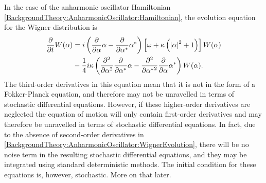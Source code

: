 In the case of the anharmonic oscillator Hamiltonian \eqref{BackgroundTheory:AnharmonicOscillator:Hamiltonian}, the evolution equation for the Wigner distribution is
\begin{align}
    \label{BackgroundTheory:AnharmonicOscillator:WignerEvolution}
    \begin{split}
        \frac{\partial}{\partial t} W(\alpha) &=  i\left( \frac{\partial}{\partial \alpha} \alpha - \frac{\partial}{\partial \alpha^*} \alpha^*\right) \left[\omega + \kappa\left(\abs{\alpha}^2 + 1\right) \right] W(\alpha)\\
        &-\frac{1}{4}i \kappa \left(\frac{\partial^2}{\partial \alpha^2}\frac{\partial}{\partial \alpha^*}\alpha - \frac{\partial^2}{\partial {\alpha^*}^2} \frac{\partial}{\partial \alpha} \alpha^*\right) W(\alpha).
    \end{split}
\end{align}
The third-order derivatives in this equation mean that it is not in the form of a Fokker-Planck equation, and therefore may not be unravelled in terms of stochastic differential equations.  However, if these higher-order derivatives are neglected the equation of motion will only contain first-order derivatives and may therefore be unravelled in terms of stochastic differential equations.  In fact, due to the absence of second-order derivatives in \eqref{BackgroundTheory:AnharmonicOscillator:WignerEvolution}, there will be no noise term in the resulting stochastic differential equations, and they may be integrated using standard deterministic methods.  The initial condition for these equations is, however, stochastic.  More on that later.

